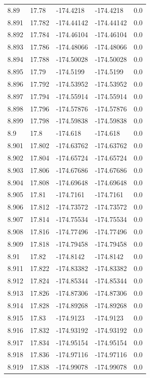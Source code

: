 \begin{tabular}{lllll}
8.89 & 17.78 & -174.4218 & -174.4218 & 0.0 \\
8.891 & 17.782 & -174.44142 & -174.44142 & 0.0 \\
8.892 & 17.784 & -174.46104 & -174.46104 & 0.0 \\
8.893 & 17.786 & -174.48066 & -174.48066 & 0.0 \\
8.894 & 17.788 & -174.50028 & -174.50028 & 0.0 \\
8.895 & 17.79 & -174.5199 & -174.5199 & 0.0 \\
8.896 & 17.792 & -174.53952 & -174.53952 & 0.0 \\
8.897 & 17.794 & -174.55914 & -174.55914 & 0.0 \\
8.898 & 17.796 & -174.57876 & -174.57876 & 0.0 \\
8.899 & 17.798 & -174.59838 & -174.59838 & 0.0 \\
8.9 & 17.8 & -174.618 & -174.618 & 0.0 \\
8.901 & 17.802 & -174.63762 & -174.63762 & 0.0 \\
8.902 & 17.804 & -174.65724 & -174.65724 & 0.0 \\
8.903 & 17.806 & -174.67686 & -174.67686 & 0.0 \\
8.904 & 17.808 & -174.69648 & -174.69648 & 0.0 \\
8.905 & 17.81 & -174.7161 & -174.7161 & 0.0 \\
8.906 & 17.812 & -174.73572 & -174.73572 & 0.0 \\
8.907 & 17.814 & -174.75534 & -174.75534 & 0.0 \\
8.908 & 17.816 & -174.77496 & -174.77496 & 0.0 \\
8.909 & 17.818 & -174.79458 & -174.79458 & 0.0 \\
8.91 & 17.82 & -174.8142 & -174.8142 & 0.0 \\
8.911 & 17.822 & -174.83382 & -174.83382 & 0.0 \\
8.912 & 17.824 & -174.85344 & -174.85344 & 0.0 \\
8.913 & 17.826 & -174.87306 & -174.87306 & 0.0 \\
8.914 & 17.828 & -174.89268 & -174.89268 & 0.0 \\
8.915 & 17.83 & -174.9123 & -174.9123 & 0.0 \\
8.916 & 17.832 & -174.93192 & -174.93192 & 0.0 \\
8.917 & 17.834 & -174.95154 & -174.95154 & 0.0 \\
8.918 & 17.836 & -174.97116 & -174.97116 & 0.0 \\
8.919 & 17.838 & -174.99078 & -174.99078 & 0.0 \\

\end{tabular}
